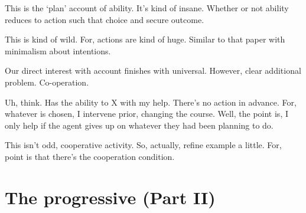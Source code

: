 \begin{note}
  This is the `plan' account of ability.
  It's kind of insane.
  Whether or not ability reduces to action such that choice and secure outcome.
\end{note}

\begin{note}
  This is kind of wild.
  For, actions are kind of huge.
  Similar to that paper with minimalism about intentions.
\end{note}

\begin{note}
  Our direct interest with account finishes with universal.
  However, clear additional problem.
  Co-operation.
\end{note}

\begin{note}
  Uh, think.
  Has the ability to X with my help.
  There's no action in advance.
  For, whatever is chosen, I intervene prior, changing the course.
  Well, the point is, I only help if the agent gives up on whatever they had been planning to do.

  This isn't odd, cooperative activity.
  So, actually, refine example a little.
  For, point is that there's the cooperation condition.
\end{note}

\section{The progressive (Part II)}
\label{cha:sec:fcs-def:progressive}

